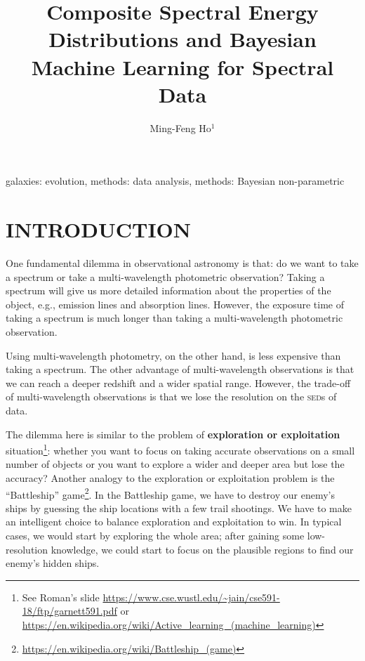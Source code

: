 \documentclass{ar-1col}
\begin{document}

\title{Composite Spectral Energy Distributions and Bayesian Machine Learning for Spectral Data}

\author{Ming-Feng Ho$^1$
}

\begin{abstract}

\end{abstract}

\begin{keywords}
galaxies: evolution, methods: data analysis, methods: Bayesian non-parametric
\end{keywords}
\maketitle

\tableofcontents


\section{INTRODUCTION}
One fundamental dilemma in observational astronomy is that: do we want to take a spectrum or take a multi-wavelength photometric observation? 
Taking a spectrum will give us more detailed information about the properties of the object, e.g., emission lines and absorption lines. 
However, the exposure time of taking a spectrum is much longer than taking a multi-wavelength photometric observation. 

Using multi-wavelength photometry, on the other hand, is less expensive than taking a spectrum. 
The other advantage of multi-wavelength observations is that we can reach a deeper redshift and a wider spatial range.
However, the trade-off of multi-wavelength observations is that we lose the resolution on the \textsc{sed}s of data.

The dilemma here is similar to the problem of \textbf{ exploration or exploitation } situation\footnote{See Roman's slide \citep{Garnett18} \url{https://www.cse.wustl.edu/~jain/cse591-18/ftp/garnett591.pdf} or \url{https://en.wikipedia.org/wiki/Active_learning_(machine_learning)}}:
whether you want to focus on taking accurate observations on a small number of objects or you want to explore a wider and deeper area but lose the accuracy?
Another analogy to the exploration or exploitation problem is the ``Battleship'' game\footnote{\url{https://en.wikipedia.org/wiki/Battleship_(game)}}.
In the Battleship game, we have to destroy our enemy's ships by guessing the ship locations with a few trail shootings.
We have to make an intelligent choice to balance exploration and exploitation to win.
In typical cases, we would start by exploring the whole area; after gaining some low-resolution knowledge, we could start to focus on the plausible regions to find our enemy's hidden ships.
\end{document}
